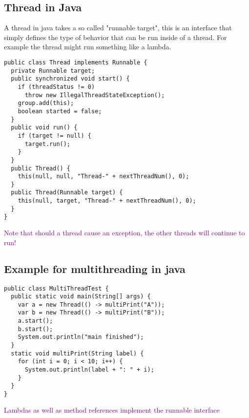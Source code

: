 \documentclass[main.tex,fontsize=8pt,paper=a4,paper=portrait,DIV=calc,]{scrartcl}
\begin{document}
\subsection{Thread in Java}
A thread in java takes a so called "runnable target", this is an interface that simply defines the type of behavior that can be run inside of a thread. \newline
For example the thread might run something like a lambda.
\begin{lstlisting}
public class Thread implements Runnable {
  private Runnable target;
  public synchronized void start() {
    if (threadStatus != 0)
      throw new IllegalThreadStateException();
    group.add(this);
    boolean started = false;
  }
  public void run() {
    if (target != null) {
      target.run(); 
    }
  }
  public Thread() {
    this(null, null, "Thread-" + nextThreadNum(), 0);
  }
  public Thread(Runnable target) {
    this(null, target, "Thread-" + nextThreadNum(), 0);
  }
}
\end{lstlisting}
\vspace{2mm}
\textcolor{purple}{Note that should a thread cause an exception, the other threads will continue to run!}

\subsection{Example for multithreading in java}
\begin{lstlisting}
public class MultiThreadTest {
  public static void main(String[] args) {
    var a = new Thread(() -> multiPrint("A"));
    var b = new Thread(() -> multiPrint("B"));
    a.start();
    b.start();
    System.out.println("main finished");
  }
  static void multiPrint(String label) {
    for (int i = 0; i < 10; i++) {
      System.out.println(label + ": " + i);
    }
  }
}
\end{lstlisting}
\vspace{2mm}
\textcolor{purple}{Lambdas as well as method references implement the runnable interface}
\end{document}
